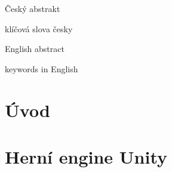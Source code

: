 \documentclass[FM,Proj]{tulthesis}
\begin{document}
	
	\begin{abstractCZ}
		Český abstrakt
	\end{abstractCZ}
	
	\begin{keywordsCZ}
		klíčová slova česky
	\end{keywordsCZ}
	\vspace{2cm}
	
	\begin{abstractEN}
		English abstract
	\end{abstractEN}
	
	\begin{keywordsEN}
		keywords in English
	\end{keywordsEN}
	
	\tableofcontents
	
	\listoffigures
	
	
	\clearpage
	
	
	\chapter{Úvod}
	
	\chapter{Herní engine Unity}
	
\end{document}
